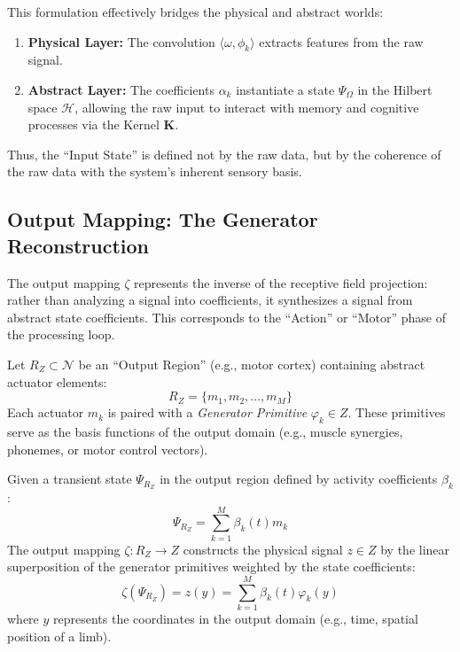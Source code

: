 \documentclass[twocolumn, 10pt]{article}
\begin{document}
This formulation effectively bridges the physical and abstract worlds:
\begin{enumerate}
    \item \textbf{Physical Layer:} The convolution $\langle \omega, \phi_k \rangle$ extracts features from the raw signal.
    \item \textbf{Abstract Layer:} The coefficients $\alpha_k$ instantiate a state $\Psi_\Omega$ in the Hilbert space $\mathcal{H}$, allowing the raw input to interact with memory and cognitive processes via the Kernel $\mathbf{K}$.
\end{enumerate}

Thus, the ``Input State'' is defined not by the raw data, but by the coherence of the raw data with the system's inherent sensory basis.

\subsection{Output Mapping: The Generator Reconstruction}
The output mapping $\zeta$ represents the inverse of the receptive field projection: rather than analyzing a signal into coefficients, it synthesizes a signal from abstract state coefficients. This corresponds to the ``Action'' or ``Motor'' phase of the processing loop.

Let $R_Z \subset \mathcal{N}$ be an ``Output Region'' (e.g., motor cortex) containing abstract actuator elements:
\begin{equation}
    R_Z = \{ m_1, m_2, \dots, m_M \}
\end{equation}
Each actuator $m_k$ is paired with a \textit{Generator Primitive} $\varphi_k \in Z$. These primitives serve as the basis functions of the output domain (e.g., muscle synergies, phonemes, or motor control vectors).

Given a transient state $\Psi_{R_Z}$ in the output region defined by activity coefficients $\beta_k$:
\begin{equation}
    \Psi_{R_Z} = \sum_{k=1}^M \beta_k(t) m_k
\end{equation}
The output mapping $\zeta : R_Z \to Z$ constructs the physical signal $z \in Z$ by the linear superposition of the generator primitives weighted by the state coefficients:
\begin{equation}
    \zeta(\Psi_{R_Z}) = z(y) = \sum_{k=1}^M \beta_k(t) \varphi_k(y)
\end{equation}
where $y$ represents the coordinates in the output domain (e.g., time, spatial position of a limb).
\end{document}
